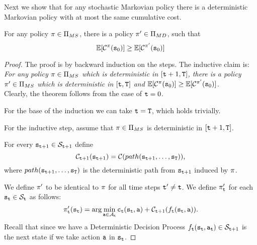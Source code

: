 Next we show that for any stochastic Markovian policy there is a
deterministic Markovian policy with at most the same cumulative
cost.

\begin{theorem}
\label{chp2:stochastic-deterministic}
For any policy $\pi\in \Pi_{MS}$, there is a policy
$\pi'\in\Pi_{MD}$, such that
\[
\mathbb{E}[\mathcal{C}^\pi({\tt s}_0)]\geq \mathbb{E}[\mathcal{C}^{\pi'}({\tt s}_0)]
\]
\end{theorem}

\begin{proof}
The proof is by backward induction on the steps. The inductive claim is:\\
{\em For any policy $\pi\in \Pi_{MS}$ which is deterministic in
$[{\tt t}+1,{\tt T}]$, there is a policy $\pi'\in \Pi_{MS}$
which is deterministic in $[{\tt t},{\tt T}]$ and
$\mathbb{E}[\mathcal{C}^\pi({\tt s}_0)]\geq
\mathbb{E}[\mathcal{C}^{\pi'}({\tt s}_0)]$.}\\
Clearly, the theorem follows from the case of ${\tt t}=0$.

For the base of the induction we can take ${\tt t}={\tt T}$, which
holds trivially.

For the inductive step, assume that $\pi\in \Pi_{MS}$ is
deterministic in $[{\tt t}+1,{\tt T}]$.


For every ${\tt s}_{{\tt t}+1}\in \mathcal{S}_{{\tt t}+1}$ define
\[
\mathcal{C}_{{\tt t}+1}({\tt s}_{{\tt t}+1})=\mathcal{C}(path({\tt s}_{{\tt t}+1},
\dots , {\tt s}_{\tt T})),
\]
where $path({\tt s}_{{\tt t}+1}, \dots , {\tt s}_{\tt T})$ is the
deterministic path from ${\tt s}_{{\tt t}+1}$ induced by $\pi$.

We define $\pi'$ to be identical to $\pi$ for all time steps
${\tt t}'\neq {\tt t}$. We define $\pi'_{\tt t}$ for each
${\tt s}_{\tt t}\in \mathcal{S}_{\tt t}$ as follows:
\begin{equation}
\label{eq:sec2-MS-MD}
\pi'_{\tt t}({\tt s}_{\tt t})=\arg\min_{{\tt a}\in
\mathcal{A}_{\tt t}} {\tt c}_{{\tt t}}({\tt s}_{\tt t},{\tt a})+
\mathcal{C}_{{\tt t}+1}(f_{\tt t}({\tt s}_{\tt t},{\tt a})).
\end{equation}
Recall that since we have a Deterministic Decision Process
$f_{\tt t}({\tt s}_{\tt t},{\tt a}_{\tt t})\in \mathcal{S}_{{\tt t}+1}$ is
the next state if we take action ${\tt a}$ in ${\tt s}_{\tt t}$.


\end{proof}
